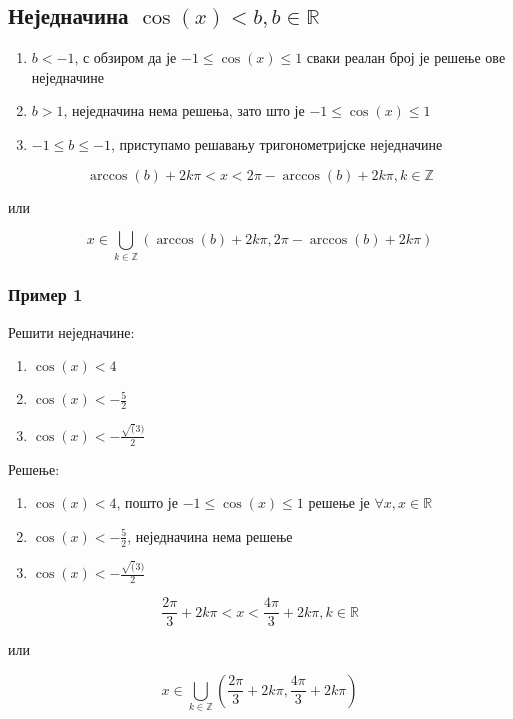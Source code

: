 \documentclass[../diplomski.tex]{subfiles}
\begin{document}
\subsection{Неједначина $\cos(x)<b,b\in\mathbb{R}$}

\begin{enumerate}[label=\alph*)]
\item $b<-1$, с обзиром да је $-1\leq\cos(x)\leq1$ сваки реалан број је решење ове неједначине
\item $b>1$, неједначина нема решења, зато што је $-1\leq\cos(x)\leq1$
\item $-1\leq b\leq-1$, приступамо решавању тригонометријске неједначине
\end{enumerate}



\[\arccos(b)+2k\pi<x<2\pi-\arccos(b)+2k\pi,k\in\mathbb{Z}\]
\centerline{или}
\[x\in\bigcup_{k\in\mathbb{Z}}\left(\arccos(b)+2k\pi,2\pi-\arccos(b)+2k\pi\right)\]


\subsubsection{Пример 1}

Решити неједначине:

\begin{enumerate}[label=\alph*)]
\item $\cos(x)<4$
\item $\cos(x)<-\frac{5}{2}$
\item $\cos(x)<-\frac{\sqrt(3)}{2}$
\end{enumerate}

Решење:

\begin{enumerate}[label=\alph*)]
\item $\cos(x)<4$, пошто је $-1\leqslant\cos(x)\leqslant1$ решење је $\forall x,x\in\mathbb{R}$
\item $\cos(x)<-\frac{5}{2}$, неједначина нема решење
\item $\cos(x)<-\frac{\sqrt(3)}{2}$
\end{enumerate}



\[\frac{2\pi}{3}+2k\pi<x<\frac{4\pi}{3}+2k\pi,k\in\mathbb{R}\]
\centerline{или}
\[x\in\bigcup_{k\in\mathbb{Z}}\left(\frac{2\pi}{3}+2k\pi,\frac{4\pi}{3}+2k\pi\right)\]
\end{document}
